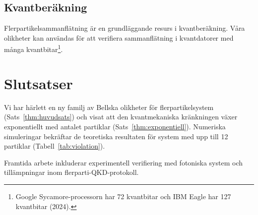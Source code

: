 \documentclass[12pt,a4paper]{article}
\theoremstyle{plain}
\theoremstyle{definition}
\theoremstyle{remark}
\begin{document}
\subsection{Kvantber\"akning}

Flerpartikelsammanfl\"atning \"ar en grundl\"aggande resurs i
kvantber\"akning. V\r{a}ra olikheter kan anv\"andas f\"or att
verifiera sammanfl\"atning i kvantdatorer med m\r{a}nga
kvantbitar\footnote{Google Sycamore-processorn har 72 kvantbitar
och IBM Eagle har 127 kvantbitar (2024).}.

\section{Slutsatser}
\label{sec:slutsatser}

Vi har h\"arlett en ny familj av Bellska olikheter f\"or
flerpartikelsystem (Sats~\ref{thm:huvudsats}) och visat att
den kvantmekaniska kr\"ankningen v\"axer exponentiellt med
antalet partiklar (Sats~\ref{thm:exponentiell}). Numeriska
simuleringar bekr\"aftar de teoretiska resultaten f\"or system
med upp till 12 partiklar (Tabell~\ref{tab:violation}).

Framtida arbete inkluderar experimentell verifiering med
fotoniska system och till\"ampningar inom flerparti-QKD-protokoll.
\end{document}
